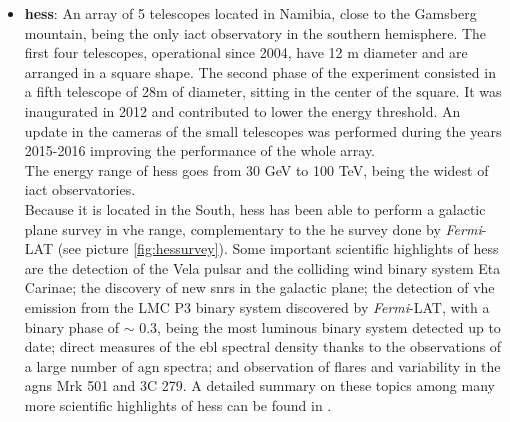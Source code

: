 \documentclass[main.tex]{subfiles}
\begin{document}
\begin{itemize}
    
    \item \textbf{\gls{hess}}: An array of 5 telescopes located in Namibia, close to the Gamsberg mountain, being the only \gls{iact} observatory in the southern hemisphere. The first four telescopes, operational since 2004, have 12 m diameter and are arranged in a square shape. The second phase of the experiment consisted in a fifth telescope of 28m of diameter, sitting in the center of the square. It was inaugurated in 2012 and contributed to lower the energy threshold. An update in the cameras of the small telescopes was performed during the years 2015-2016 improving the performance of the whole array.\\
    The energy range of \gls{hess} goes from 30 GeV to 100 TeV, being the widest of \gls{iact} observatories.\\
    Because it is located in the South, \gls{hess} has been able to perform a galactic plane survey in \gls{vhe} range, complementary to the \gls{he} survey done  by \textit{Fermi}-LAT (see picture \ref{fig:hessurvey}). Some important scientific highlights of \gls{hess} are the detection of the Vela pulsar and the colliding wind binary system Eta Carinae; the discovery of new \glspl{snr} in the galactic plane; the detection of \gls{vhe} emission from the LMC P3 binary system discovered by \textit{Fermi}-LAT, with a binary phase of $\sim$ 0.3, being the most luminous binary system detected up to date;  direct measures of the \gls{ebl} spectral density thanks to the observations of a large number of \gls{agn} spectra; and observation of flares and variability  in the \glspl{agn} Mrk 501 and 3C 279. A detailed summary on these topics among many more scientific highlights of \gls{hess} can be found in \cite{2018HESS}.\\
    

\end{itemize}
\end{document}
